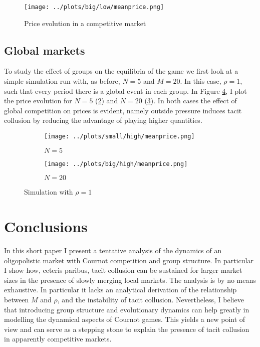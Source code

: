 \documentclass[american]{scrartcl}
\begin{document}
\begin{center}
    \begin{figure}[H]
        \center
        \texttt{[image: ../plots/big/low/meanprice.png]}
        \caption{Price evolution in a competitive market}
        \label{fig:price_large_local}
    \end{figure}
\end{center}

\subsection{Global markets}

To study the effect of groups on the equilibria of the game we first look at a simple simulation run with, as before, $N = 5$ and $M = 20$. In this case, $\rho = 1$, such that every period there is a global event in each group. In Figure \ref{fig:cert}, I plot the price evolution for $N = 5$ (\ref{fig:cert:small}) and $N = 20$ (\ref{fig:cert:big}). In both cases the effect of global competition on prices is evident, namely outside pressure induces tacit collusion by reducing the advantage of playing higher quantities.


\begin{figure}[H]
    \begin{subfigure}{.5\textwidth}
        \centering
        \texttt{[image: ../plots/small/high/meanprice.png]}
        \caption{$N = 5$}
        \label{fig:cert:small}
    \end{subfigure}%
    \begin{subfigure}{.5\textwidth}
        \centering
        \texttt{[image: ../plots/big/high/meanprice.png]}
        \caption{$N = 20$}
        \label{fig:cert:big}
    \end{subfigure}
    \caption{Simulation with $\rho = 1$}
    \label{fig:cert}
\end{figure}

\section{Conclusions}

In this short paper I present a tentative analysis of the dynamics of an oligopolistic market with Cournot competition and group structure. In particular I show how, ceteris paribus, tacit collusion can be sustained for larger market sizes in the presence of slowly merging local markets. The analysis is by no means exhaustive. In particular it lacks an analytical derivation of the relationship between $M$ and $\rho$, and the instability of tacit collusion. Nevertheless, I believe that introducing group structure and evolutionary dynamics can help greatly in modelling the dynamical aspects of Cournot games. This yields a new point of view and can serve as a stepping stone to explain the presence of tacit collusion in apparently competitive markets.
\end{document}
